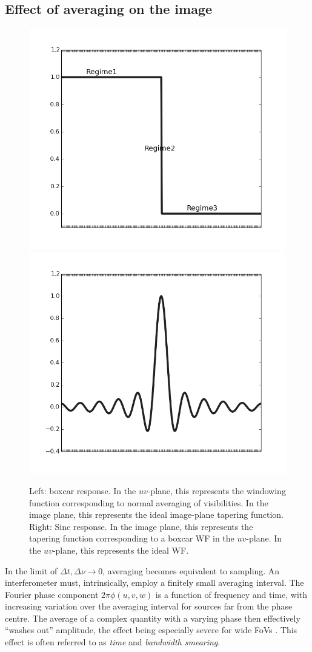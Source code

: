 \documentclass[useAMS,usenatbib]{mn2e}
\begin{document}
\subsection{Effect of averaging on the image}
\label{sec:effectbw}

\begin{figure}
\includegraphics[width=.5\textwidth]{./Figures/idealIPRgrey.png}%
\includegraphics[width=.5\textwidth]{./Figures/idealsincgrey.png}\\
\caption{Left: boxcar response. In the $uv$-plane, this represents the windowing function corresponding to normal
averaging of visibilities. In the image plane, this represents the ideal image-plane tapering function. Right: 
Sinc response. In the image plane, this represents the tapering function corresponding to a boxcar WF in 
the $uv$-plane. In the $uv$-plane, this represents the ideal WF.}
\label{fig:idealWF}
\end{figure}

In the limit of $\Delta t,\Delta \nu \rightarrow 0$, averaging becomes equivalent to sampling. 
An interferometer must, intrinsically, employ a finitely small averaging interval. The Fourier phase 
component $2\pi\phi(u,v,w)$ is a function of frequency and time, with increasing variation over the averaging interval 
for sources far from the phase centre. The average of a complex quantity with a varying phase then effectively ``washes out'' 
amplitude, the effect being especially severe for wide FoVs \citep[for an extensive discussion, see][]{bregman2012system}. This
effect is often referred to as \emph{time} and \emph{bandwidth smearing}.
\end{document}
